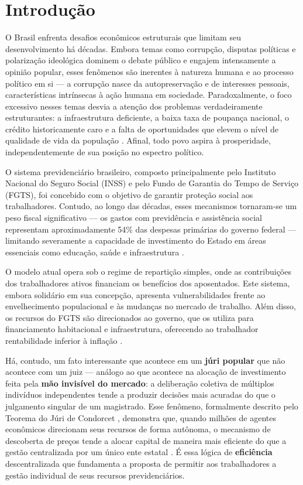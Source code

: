 \chapter{Introdução}
\label{cap:introducao}

O Brasil enfrenta desafios econômicos estruturais que limitam seu desenvolvimento há décadas. Embora temas como corrupção, disputas políticas e polarização ideológica dominem o debate público e engajem intensamente a opinião popular, esses fenômenos são inerentes à natureza humana e ao processo político em si --- a corrupção nasce da autopreservação e de interesses pessoais, características intrínsecas à ação humana em sociedade. Paradoxalmente, o foco excessivo nesses temas desvia a atenção dos problemas verdadeiramente estruturantes: a infraestrutura deficiente, a baixa taxa de poupança nacional, o crédito historicamente caro e a falta de oportunidades que elevem o nível de qualidade de vida da população \cite{giambiagi2011}. Afinal, todo povo aspira à prosperidade, independentemente de sua posição no espectro político.

O sistema previdenciário brasileiro, composto principalmente pelo Instituto Nacional do Seguro Social (INSS) e pelo Fundo de Garantia do Tempo de Serviço (FGTS), foi concebido com o objetivo de garantir proteção social aos trabalhadores. Contudo, ao longo das décadas, esses mecanismos tornaram-se um peso fiscal significativo --- os gastos com previdência e assistência social representam aproximadamente 54\% das despesas primárias do governo federal --- limitando severamente a capacidade de investimento do Estado em áreas essenciais como educação, saúde e infraestrutura \cite{ifi2023}.

O modelo atual opera sob o regime de repartição simples, onde as contribuições dos trabalhadores ativos financiam os benefícios dos aposentados. Este sistema, embora solidário em sua concepção, apresenta vulnerabilidades frente ao envelhecimento populacional e às mudanças no mercado de trabalho. Além disso, os recursos do FGTS são direcionados ao governo, que os utiliza para financiamento habitacional e infraestrutura, oferecendo ao trabalhador rentabilidade inferior à inflação \cite{afonso2016}.

Há, contudo, um fato interessante que acontece em um \textbf{júri popular} que não acontece com um juiz --- análogo ao que acontece na alocação de investimento feita pela \textbf{mão invisível do mercado}: a deliberação coletiva de múltiplos indivíduos independentes tende a produzir decisões mais acuradas do que o julgamento singular de um magistrado. Esse fenômeno, formalmente descrito pelo Teorema do Júri de Condorcet \cite{condorcet1785}, demonstra que, quando milhões de agentes econômicos direcionam seus recursos de forma autônoma, o mecanismo de descoberta de preços tende a alocar capital de maneira mais eficiente do que a gestão centralizada por um único ente estatal \cite{hayek1945}. É essa lógica de \textbf{eficiência} descentralizada que fundamenta a proposta de permitir aos trabalhadores a gestão individual de seus recursos previdenciários.

